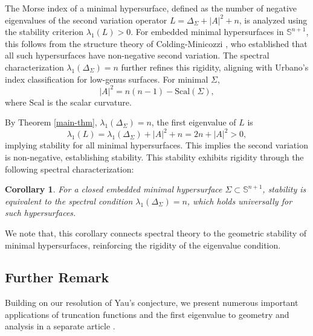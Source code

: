 \documentclass[a4, 12pt]{amsart}
\numberwithin{equation}{section} \numberwithin{equation}{section}
\newtheorem{corr}[thm]{Corollary}
\begin{document}
The Morse index of a minimal hypersurface, defined as the number of negative eigenvalues of the second variation operator \(L = \Delta_\Sigma + |A|^2 + n\), is analyzed using the stability criterion \(\lambda_1(L) > 0\). For embedded minimal hypersurfaces in \(\mathbb{S}^{n+1}\), this follows from the structure theory of Colding-Minicozzi \cite[Theorem 4.1]{ColdingMinicozzi2010}, who established that all such hypersurfaces have non-negative second variation. The spectral characterization \(\lambda_1(\Delta_\Sigma) = n\) further refines this rigidity, aligning with Urbano's index classification \cite{Urb} for low-genus surfaces. For minimal $\Sigma$, $$|A|^2 = n(n-1)-\text{Scal}(\Sigma),$$ where $\text{Scal}$ is the scalar curvature.

By Theorem \ref{main-thm}, $\lambda_1(\Delta_\Sigma) = n$,  the first eigenvalue of $L$ is $$\lambda_1(L) = \lambda_1(\Delta_\Sigma) + |A|^2 + n = 2n + |A|^2 > 0,$$ implying stability for all minimal hypersurfaces. This implies the second variation is non-negative, establishing stability. This stability exhibits rigidity through the following spectral characterization:
\begin{corr}

For a closed embedded minimal hypersurface \(\Sigma \subset \mathbb{S}^{n+1}\), stability is equivalent to the spectral condition \(\lambda_1(\Delta_\Sigma) = n\), which holds universally for such hypersurfaces.

\end{corr}
We note that, this corollary connects spectral theory to the geometric stability of minimal hypersurfaces, reinforcing the rigidity of the eigenvalue condition.



\subsection{\textbf{Further Remark}}

Building on our resolution of Yau's conjecture, we present numerous important applications of truncation functions and the first eigenvalue to geometry and analysis in a separate article \cite{Zeng2}.
\end{document}
